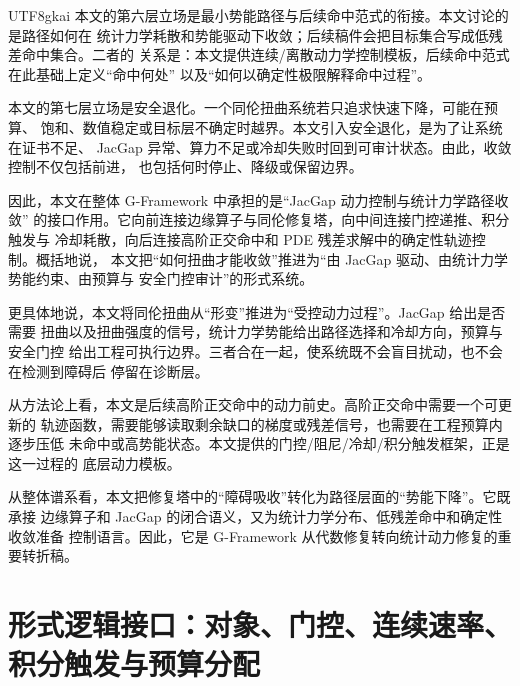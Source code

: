\documentclass[12pt]{article}
\newcommand{\GFramework}{\textsf{G-Framework}}
\begin{document}
\begin{CJK*}{UTF8}{gkai}
本文的第六层立场是最小势能路径与后续命中范式的衔接。本文讨论的是路径如何在
统计力学耗散和势能驱动下收敛；后续稿件会把目标集合写成低残差命中集合。二者的
关系是：本文提供连续/离散动力学控制模板，后续命中范式在此基础上定义“命中何处”
以及“如何以确定性极限解释命中过程”。

本文的第七层立场是安全退化。一个同伦扭曲系统若只追求快速下降，可能在预算、
饱和、数值稳定或目标层不确定时越界。本文引入安全退化，是为了让系统在证书不足、
JacGap 异常、算力不足或冷却失败时回到可审计状态。由此，收敛控制不仅包括前进，
也包括何时停止、降级或保留边界。

因此，本文在整体 \GFramework{} 中承担的是“JacGap 动力控制与统计力学路径收敛”
的接口作用。它向前连接边缘算子与同伦修复塔，向中间连接门控递推、积分触发与
冷却耗散，向后连接高阶正交命中和 PDE 残差求解中的确定性轨迹控制。概括地说，
本文把“如何扭曲才能收敛”推进为“由 JacGap 驱动、由统计力学势能约束、由预算与
安全门控审计”的形式系统。

更具体地说，本文将同伦扭曲从“形变”推进为“受控动力过程”。JacGap 给出是否需要
扭曲以及扭曲强度的信号，统计力学势能给出路径选择和冷却方向，预算与安全门控
给出工程可执行边界。三者合在一起，使系统既不会盲目扰动，也不会在检测到障碍后
停留在诊断层。

从方法论上看，本文是后续高阶正交命中的动力前史。高阶正交命中需要一个可更新的
轨迹函数，需要能够读取剩余缺口的梯度或残差信号，也需要在工程预算内逐步压低
未命中或高势能状态。本文提供的门控/阻尼/冷却/积分触发框架，正是这一过程的
底层动力模板。

从整体谱系看，本文把修复塔中的“障碍吸收”转化为路径层面的“势能下降”。它既承接
边缘算子和 JacGap 的闭合语义，又为统计力学分布、低残差命中和确定性收敛准备
控制语言。因此，它是 \GFramework{} 从代数修复转向统计动力修复的重要转折稿。

\setcounter{tocdepth}{3}
\setcounter{secnumdepth}{3}
\tableofcontents
\clearpage

\section{形式逻辑接口：对象、门控、连续速率、积分触发与预算分配}
\label{sec:tex28-ch1}


\end{CJK*}
\end{document}
